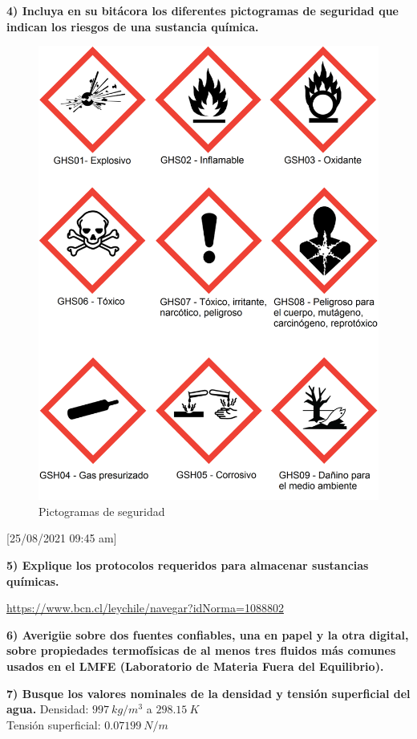 \documentclass[letterpaper,11pt]{article}
\begin{document}
\textbf{4) Incluya en su bitácora los diferentes pictogramas de seguridad que indican los riesgos de una sustancia química.}
\begin{figure}[H]
	\centering
	\includegraphics[scale=0.3]{pictogramas-de-seguridad.png} 
	\caption{Pictogramas de seguridad}
	\label{fig:picto1}
\end{figure}

[25/08/2021 09:45 am]

\textbf{5) Explique los protocolos requeridos para almacenar sustancias químicas.}

\url{https://www.bcn.cl/leychile/navegar?idNorma=1088802}

\textbf{6) Averigüe sobre dos fuentes confiables, una en papel y la otra digital, sobre propiedades termofísicas de al menos tres fluidos más comunes usados en el LMFE (Laboratorio de Materia Fuera del Equilibrio).}


\textbf{7) Busque los valores nominales de la densidad y tensión superficial del agua.}
Densidad: $\SI{997}{kg/m^3}$ a $\SI{298.15}{K}$ \\
Tensión superficial: $ \SI{0.07199}{N/m} $
\end{document}
